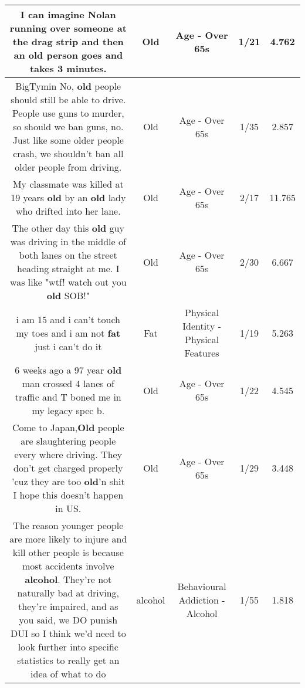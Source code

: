 \documentclass[11pt]{article}
\newlength\mylength
\begin{document}
\begin{center}
\begin{longtable}{|C{.65\mylength}|C{.30\mylength}|C{.12\mylength}|C{.12\mylength}|C{.12\mylength}|}
  \small I can imagine Nolan running over someone at the drag strip and then an \textbf{old} person goes and takes 3 minutes.\normalsize   & Old & Age - Over 65s & 1/21 & 4.762 \\  \hline
  \small BigTymin No, \textbf{old} people should still be able to drive. People use guns to murder, so should we ban guns, no. Just like some older people crash, we shouldn't ban all older people from driving.\normalsize   & Old & Age - Over 65s & 1/35 & 2.857 \\  \hline
  \small My classmate was killed at 19 years \textbf{old} by an \textbf{old} lady who drifted into her lane.\normalsize   & Old & Age - Over 65s & 2/17 & 11.765 \\  \hline
  \small The other day this \textbf{old} guy was driving in the middle of both lanes on the street heading straight at me. I was like "wtf! watch out you \textbf{old}  SOB!"\normalsize   & Old & Age - Over 65s & 2/30 & 6.667 \\  \hline
  \small i am 15 and i can't touch my toes and i am not \textbf{fat} just i can't do it\normalsize   & Fat & Physical Identity - Physical Features & 1/19 & 5.263 \\  \hline
  \small 6 weeks ago a 97 year \textbf{old} man crossed 4 lanes of traffic and T boned me in my legacy spec b.\normalsize   & Old & Age - Over 65s & 1/22 & 4.545 \\  \hline
  \small Come to Japan,\textbf{Old} people are slaughtering people every where driving. They don't get charged properly 'cuz they are too \textbf{old}'n shit I hope this doesn't happen in US.\normalsize   & Old & Age - Over 65s & 1/29 & 3.448 \\  \hline
  \small The reason younger people are more likely to injure and kill other people is because most accidents involve \textbf{alcohol}. They're not naturally bad at driving, they're impaired, and as you said, we DO punish DUI so I think we'd need to look further into specific statistics to really get an idea of what to do\normalsize   & alcohol & Behavioural Addiction - Alcohol & 1/55 & 1.818 \\  \hline

\end{longtable}
\end{center}
\end{document}
